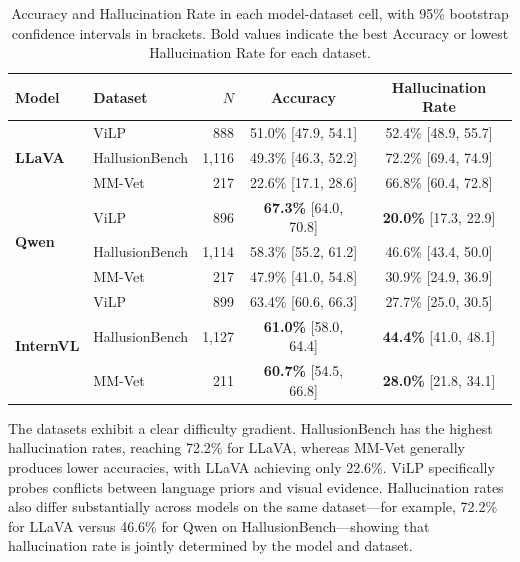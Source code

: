 \begin{table}[H]
\centering
\caption{Accuracy and Hallucination Rate in each model-dataset cell, with 95\% bootstrap confidence intervals in brackets. Bold values indicate the best Accuracy or lowest Hallucination Rate for each dataset.}
\label{tab:accuracy_hallucination_rate}
\small
\setlength{\tabcolsep}{5pt}
\renewcommand{\arraystretch}{1.18}
\begin{tabular}{@{}llrcc@{}}
\toprule
\textbf{Model} & \textbf{Dataset} & \textbf{$N$} & \textbf{Accuracy} & \textbf{Hallucination Rate} \\
\midrule
\multirow{3}{*}{\textbf{LLaVA}} & ViLP & 888 & 51.0\% {\scriptsize[47.9, 54.1]} & 52.4\% {\scriptsize[48.9, 55.7]} \\
& HallusionBench & 1,116 & 49.3\% {\scriptsize[46.3, 52.2]} & 72.2\% {\scriptsize[69.4, 74.9]} \\
& MM-Vet & 217 & 22.6\% {\scriptsize[17.1, 28.6]} & 66.8\% {\scriptsize[60.4, 72.8]} \\
\midrule
\multirow{3}{*}{\textbf{Qwen}} & ViLP & 896 & \textbf{67.3\%} {\scriptsize[64.0, 70.8]} & \textbf{20.0\%} {\scriptsize[17.3, 22.9]} \\
& HallusionBench & 1,114 & 58.3\% {\scriptsize[55.2, 61.2]} & 46.6\% {\scriptsize[43.4, 50.0]} \\
& MM-Vet & 217 & 47.9\% {\scriptsize[41.0, 54.8]} & 30.9\% {\scriptsize[24.9, 36.9]} \\
\midrule
\multirow{3}{*}{\textbf{InternVL}} & ViLP & 899 & 63.4\% {\scriptsize[60.6, 66.3]} & 27.7\% {\scriptsize[25.0, 30.5]} \\
& HallusionBench & 1,127 & \textbf{61.0\%} {\scriptsize[58.0, 64.4]} & \textbf{44.4\%} {\scriptsize[41.0, 48.1]} \\
& MM-Vet & 211 & \textbf{60.7\%} {\scriptsize[54.5, 66.8]} & \textbf{28.0\%} {\scriptsize[21.8, 34.1]} \\
\bottomrule
\end{tabular}
\end{table}

The datasets exhibit a clear difficulty gradient. HallusionBench has the highest hallucination rates, reaching 72.2\% for LLaVA, whereas MM-Vet generally produces lower accuracies, with LLaVA achieving only 22.6\%. ViLP specifically probes conflicts between language priors and visual evidence. Hallucination rates also differ substantially across models on the same dataset---for example, 72.2\% for LLaVA versus 46.6\% for Qwen on HallusionBench---showing that hallucination rate is jointly determined by the model and dataset.

